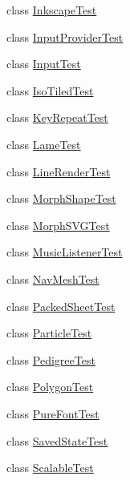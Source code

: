 \begin{DoxyCompactItemize}
\item 
class \mbox{\hyperlink{classorg_1_1newdawn_1_1slick_1_1tests_1_1_inkscape_test}{Inkscape\+Test}}
\item 
class \mbox{\hyperlink{classorg_1_1newdawn_1_1slick_1_1tests_1_1_input_provider_test}{Input\+Provider\+Test}}
\item 
class \mbox{\hyperlink{classorg_1_1newdawn_1_1slick_1_1tests_1_1_input_test}{Input\+Test}}
\item 
class \mbox{\hyperlink{classorg_1_1newdawn_1_1slick_1_1tests_1_1_iso_tiled_test}{Iso\+Tiled\+Test}}
\item 
class \mbox{\hyperlink{classorg_1_1newdawn_1_1slick_1_1tests_1_1_key_repeat_test}{Key\+Repeat\+Test}}
\item 
class \mbox{\hyperlink{classorg_1_1newdawn_1_1slick_1_1tests_1_1_lame_test}{Lame\+Test}}
\item 
class \mbox{\hyperlink{classorg_1_1newdawn_1_1slick_1_1tests_1_1_line_render_test}{Line\+Render\+Test}}
\item 
class \mbox{\hyperlink{classorg_1_1newdawn_1_1slick_1_1tests_1_1_morph_shape_test}{Morph\+Shape\+Test}}
\item 
class \mbox{\hyperlink{classorg_1_1newdawn_1_1slick_1_1tests_1_1_morph_s_v_g_test}{Morph\+S\+V\+G\+Test}}
\item 
class \mbox{\hyperlink{classorg_1_1newdawn_1_1slick_1_1tests_1_1_music_listener_test}{Music\+Listener\+Test}}
\item 
class \mbox{\hyperlink{classorg_1_1newdawn_1_1slick_1_1tests_1_1_nav_mesh_test}{Nav\+Mesh\+Test}}
\item 
class \mbox{\hyperlink{classorg_1_1newdawn_1_1slick_1_1tests_1_1_packed_sheet_test}{Packed\+Sheet\+Test}}
\item 
class \mbox{\hyperlink{classorg_1_1newdawn_1_1slick_1_1tests_1_1_particle_test}{Particle\+Test}}
\item 
class \mbox{\hyperlink{classorg_1_1newdawn_1_1slick_1_1tests_1_1_pedigree_test}{Pedigree\+Test}}
\item 
class \mbox{\hyperlink{classorg_1_1newdawn_1_1slick_1_1tests_1_1_polygon_test}{Polygon\+Test}}
\item 
class \mbox{\hyperlink{classorg_1_1newdawn_1_1slick_1_1tests_1_1_pure_font_test}{Pure\+Font\+Test}}
\item 
class \mbox{\hyperlink{classorg_1_1newdawn_1_1slick_1_1tests_1_1_saved_state_test}{Saved\+State\+Test}}
\item 
class \mbox{\hyperlink{classorg_1_1newdawn_1_1slick_1_1tests_1_1_scalable_test}{Scalable\+Test}}

\end{DoxyCompactItemize}
